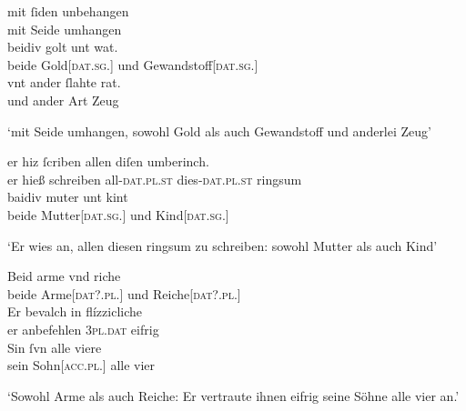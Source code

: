 \begin{exe}
\ex \label{ex:datregul}
	\gll mit ſiden unbehangen \\
		mit Seide umhangen \\
\sn \gll beidiv golt unt wat. \\
		beide Gold[\textsc{dat.sg.\NeutI}] und Gewandstoff[\textsc{dat.sg.\FemI}] \\
\sn \gll vnt ander ſlahte rat. \\
		und ander Art Zeug \\
	\begin{taggedline}{\parencites[7ra,23--25]{kc:A1}[1543--1545]{schroeder1895}}
	\trans `mit Seide umhangen, sowohl Gold als auch Gewandstoff und
		anderlei Zeug'
	\end{taggedline}

\ex \label{ex:datextra}
	\begin{xlist}
	\ex \label{ex:datextra_1}
		\gll er hiz ſcriben allen diſen umberinch. \\
			er hieß schreiben all-\textsc{dat.pl.st} dies-\textsc{dat.pl.st} ringsum \\
	\sn \gll baidiv muter unt kint \\
			beide Mutter[\textsc{dat.sg.\FemF}] und Kind[\textsc{dat.sg.\NeutA}] \\
		\begin{taggedline}{\parencites[\pno~3rb,46--\pno~3va,1]{kc:A1}[617--618]{schroeder1895}}
		\trans `Er wies an, allen diesen ringsum zu schreiben: sowohl
			Mutter als auch Kind'
		\end{taggedline}

	\ex \label{ex:datextra_2}
		\gll Beid arme vnd riche \\
			beide Arme[\textsc{dat?.pl.\MascA}] und Reiche[\textsc{dat?.pl.\MascA}] \\
	\sn \gll Er bevalch in flízzicliche \\
			er anbefehlen \textsc{3pl.dat} eifrig \\
	\sn \gll Sin ſvn alle viere \\
			sein Sohn[\textsc{acc.pl.\MascM}] alle vier \\
		\begin{taggedline}{\parencites[\pno~94rb,23--26]{kc:VB}[zu][13854--13855]{schroeder1895}}
		\trans `Sowohl Arme als auch Reiche: Er
			vertraute ihnen eifrig seine Söhne alle vier an.'
		\end{taggedline}
	\end{xlist}
\end{exe}

